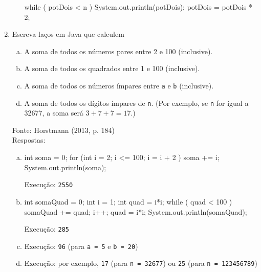 \documentclass[onecolumn,a4paper,10pt]{report}
\newcommand{\+}{\, + \,}
\newcommand{\<}{\hspace*{-0.4cm}}
\begin{document}
\begin{enumerate}[1.]
\begin{enumerate}[a)]
\begin{javacode}
while ( potDois < n ) {
   System.out.println(potDois);
   potDois = potDois * 2;
}
\end{javacode}
\end{enumerate}

\item Escreva laços em Java que calculem
\begin{enumerate}[a)]
	\item A soma de todos os números pares entre 2 e 100 (inclusive).
	\item A soma de todos os quadrados entre 1 e 100 (inclusive).
	\item A soma de todos os números ímpares entre \texttt{a} e \texttt{b} (inclusive).
	\item A soma de todos os dígitos ímpares de \texttt{n}. (Por exemplo, se \texttt{n} for igual a 32677, a soma será $3 + 7 + 7 = 17$.)
\end{enumerate}
{\tiny Fonte: Horstmann (2013, p. 184)}\\
Respostas:
\begin{enumerate}[a)]
	\item
\begin{javacode}
int soma = 0;
for (int i = 2; i <= 100; i = i + 2 ) {
   soma += i;
}
System.out.println(soma);
\end{javacode}
Execução: \texttt{2550}
	\item
\begin{javacode}
int somaQuad = 0;
int i = 1;
int quad = i*i;
while ( quad < 100 ) {
   somaQuad += quad;
   i++;
   quad = i*i;
}
System.out.println(somaQuad);
\end{javacode}
Execução: \texttt{285}
	\item
{}
Execução: \texttt{96} (para \texttt{a = 5} e \texttt{b = 20})
	\item
{}
Execução: por exemplo, \texttt{17} (para \texttt{n = 32677}) ou \texttt{25} (para \texttt{n = 123456789})
\end{enumerate}


\end{enumerate}
\end{document}
